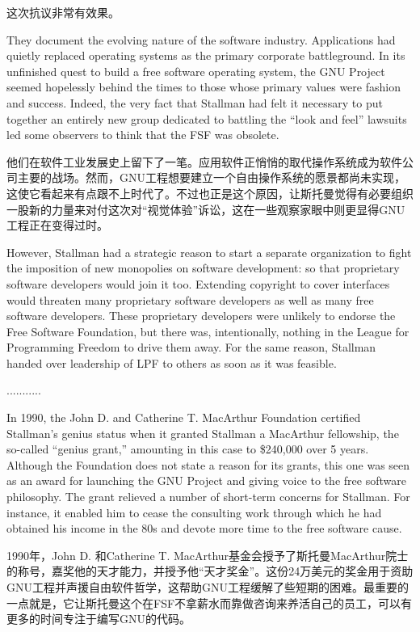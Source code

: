 \ifdefined\chs
这次抗议非常有效果。 
\fi

\ifdefined\eng
They document the evolving nature of the software industry. Applications had quietly replaced operating systems as the primary corporate battleground. In its unfinished quest to build a free software operating system, the GNU Project seemed hopelessly behind the times to those whose primary values were fashion and success. Indeed, the very fact that Stallman had felt it necessary to put together an entirely new group dedicated to battling the ``look and feel'' lawsuits led some observers to think that the FSF was obsolete.
\fi

\ifdefined\chs
他们在软件工业发展史上留下了一笔。应用软件正悄悄的取代操作系统成为软件公司主要的战场。然而，GNU工程想要建立一个自由操作系统的愿景都尚未实现，这使它看起来有点跟不上时代了。不过也正是这个原因，让斯托曼觉得有必要组织一股新的力量来对付这次对``视觉体验''诉讼，这在一些观察家眼中则更显得GNU工程正在变得过时。
\fi

\ifdefined\eng
However, Stallman had a strategic reason to start a separate organization to fight the imposition of new monopolies on software development: so that proprietary software developers would join it too.  Extending copyright to cover interfaces would threaten many proprietary software developers as well as many free software developers.  These proprietary developers were unlikely to endorse the Free Software Foundation, but there was, intentionally, nothing in the League for Programming Freedom to drive them away.  For the same reason, Stallman handed over leadership of LPF to others as soon as it was feasible.
\fi

\ifdefined\chs
...........
\fi

\ifdefined\eng
In 1990, the John D. and Catherine T. MacArthur Foundation certified Stallman's genius status when it granted Stallman a MacArthur fellowship, the so-called ``genius grant,'' amounting in this case to \$240,000 over 5 years. Although the Foundation does not state a reason for its grants, this one was seen as an award for launching the GNU Project and giving voice to the free software philosophy.  The grant relieved a number of short-term concerns for Stallman.  For instance, it enabled him to cease the consulting work through which he had obtained his income in the 80s and devote more time to the free software cause.
\fi

\ifdefined\chs
1990年，John D. 和Catherine T. MacArthur基金会授予了斯托曼MacArthur院士的称号，嘉奖他的天才能力，并授予他``天才奖金''。这份24万美元的奖金用于资助GNU工程并声援自由软件哲学，这帮助GNU工程缓解了些短期的困难。最重要的一点就是，它让斯托曼这个在FSF不拿薪水而靠做咨询来养活自己的员工，可以有更多的时间专注于编写GNU的代码。
\fi

